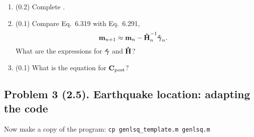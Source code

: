 \documentclass[11pt,titlepage,fleqn]{article}
\begin{document}
\begin{enumerate}
\begin{enumerate}
\vspace{1cm}

\item (0.2) Complete .

\item (0.1) Compare Eq.~6.319 with Eq.~6.291,
%
\begin{equation}
\mbox{${\bf m}$}_{n+1} \approx \mbox{${\bf m}$}_{n} - \mbox{\boldmath{$\hat{\rm H}$}}^{-1}_n \mbox{\boldmath{$\hat{\gamma}$}}_n.
\end{equation}
%
What are the expressions for $\mbox{\boldmath{$\hat{\gamma}$}}$ and $\mbox{\boldmath{$\hat{\rm H}$}}$?

\vspace{1cm}

\item (0.1) What is the equation for $\mbox{${\bf C}$}_{\rm post}$?

\end{enumerate}

\end{enumerate}


\clearpage\pagebreak
\subsection*{Problem 3 (2.5). Earthquake location: adapting the code}

Now make a copy of the program: \verb+cp genlsq_template.m genlsq.m+
\end{document}
